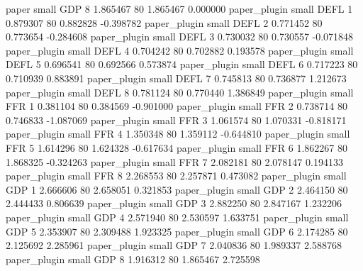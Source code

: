                    paper      small      GDP                 8 1.865467 80       1.865467           0.000000
            paper_plugin      small     DEFL                 1 0.879307 80       0.882828          -0.398782
            paper_plugin      small     DEFL                 2 0.771452 80       0.773654          -0.284608
            paper_plugin      small     DEFL                 3 0.730032 80       0.730557          -0.071848
            paper_plugin      small     DEFL                 4 0.704242 80       0.702882           0.193578
            paper_plugin      small     DEFL                 5 0.696541 80       0.692566           0.573874
            paper_plugin      small     DEFL                 6 0.717223 80       0.710939           0.883891
            paper_plugin      small     DEFL                 7 0.745813 80       0.736877           1.212673
            paper_plugin      small     DEFL                 8 0.781124 80       0.770440           1.386849
            paper_plugin      small      FFR                 1 0.381104 80       0.384569          -0.901000
            paper_plugin      small      FFR                 2 0.738714 80       0.746833          -1.087069
            paper_plugin      small      FFR                 3 1.061574 80       1.070331          -0.818171
            paper_plugin      small      FFR                 4 1.350348 80       1.359112          -0.644810
            paper_plugin      small      FFR                 5 1.614296 80       1.624328          -0.617634
            paper_plugin      small      FFR                 6 1.862267 80       1.868325          -0.324263
            paper_plugin      small      FFR                 7 2.082181 80       2.078147           0.194133
            paper_plugin      small      FFR                 8 2.268553 80       2.257871           0.473082
            paper_plugin      small      GDP                 1 2.666606 80       2.658051           0.321853
            paper_plugin      small      GDP                 2 2.464150 80       2.444433           0.806639
            paper_plugin      small      GDP                 3 2.882250 80       2.847167           1.232206
            paper_plugin      small      GDP                 4 2.571940 80       2.530597           1.633751
            paper_plugin      small      GDP                 5 2.353907 80       2.309488           1.923325
            paper_plugin      small      GDP                 6 2.174285 80       2.125692           2.285961
            paper_plugin      small      GDP                 7 2.040836 80       1.989337           2.588768
            paper_plugin      small      GDP                 8 1.916312 80       1.865467           2.725598